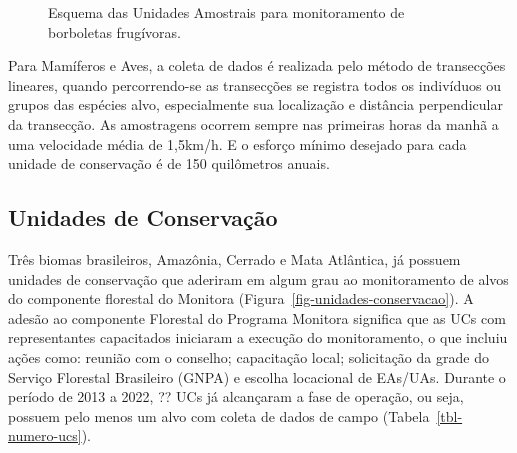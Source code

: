 \documentclass[
  letterpaper,
]{scrbook}
\begin{document}
\begin{figure}[H]


\caption{\label{fig-esquema-borboletas}Esquema das Unidades Amostrais
para monitoramento de borboletas frugívoras.}

\end{figure}%

Para Mamíferos e Aves, a coleta de dados é realizada pelo método de
transecções lineares, quando percorrendo-se as transecções se registra
todos os indivíduos ou grupos das espécies alvo, especialmente sua
localização e distância perpendicular da transecção. As amostragens
ocorrem sempre nas primeiras horas da manhã a uma velocidade média de
1,5km/h. E o esforço mínimo desejado para cada unidade de conservação é
de 150 quilômetros anuais.

\subsection{Unidades de
Conservação}\label{unidades-de-conservauxe7uxe3o}

Três biomas brasileiros, Amazônia, Cerrado e Mata Atlântica, já possuem
unidades de conservação que aderiram em algum grau ao monitoramento de
alvos do componente florestal do Monitora
(Figura~\ref{fig-unidades-conservacao}). A adesão ao componente
Florestal do Programa Monitora significa que as UCs com representantes
capacitados iniciaram a execução do monitoramento, o que incluiu ações
como: reunião com o conselho; capacitação local; solicitação da grade do
Serviço Florestal Brasileiro (GNPA) e escolha locacional de EAs/UAs.
Durante o período de 2013 a 2022, ?? UCs já alcançaram a fase de
operação, ou seja, possuem pelo menos um alvo com coleta de dados de
campo (Tabela~\ref{tbl-numero-ucs}).
\end{document}
